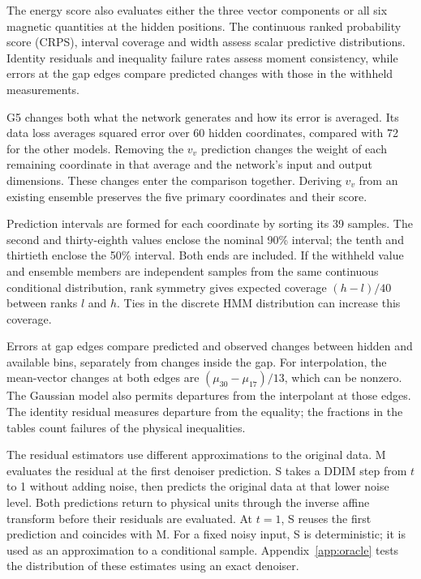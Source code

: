 \documentclass{article}
\begin{document}
The energy score also evaluates either the three vector components or all six magnetic quantities at the hidden positions. The continuous ranked probability score (CRPS), interval coverage and width assess scalar predictive distributions. Identity residuals and inequality failure rates assess moment consistency, while errors at the gap edges compare predicted changes with those in the withheld measurements.

G5 changes both what the network generates and how its error is averaged. Its data loss averages squared error over 60 hidden coordinates, compared with 72 for the other models. Removing the $v_v$ prediction changes the weight of each remaining coordinate in that average and the network's input and output dimensions. These changes enter the comparison together. Deriving $v_v$ from an existing ensemble preserves the five primary coordinates and their score.

Prediction intervals are formed for each coordinate by sorting its 39 samples. The second and thirty-eighth values enclose the nominal 90\% interval; the tenth and thirtieth enclose the 50\% interval. Both ends are included. If the withheld value and ensemble members are independent samples from the same continuous conditional distribution, rank symmetry gives expected coverage $(h-l)/40$ between ranks $l$ and $h$. Ties in the discrete HMM distribution can increase this coverage.

Errors at gap edges compare predicted and observed changes between hidden and available bins, separately from changes inside the gap. For interpolation, the mean-vector changes at both edges are $(\mu_{30}-\mu_{17})/13$, which can be nonzero. The Gaussian model also permits departures from the interpolant at those edges. The identity residual measures departure from the equality; the fractions in the tables count failures of the physical inequalities.

The residual estimators use different approximations to the original data. M evaluates the residual at the first denoiser prediction. S takes a DDIM step from $t$ to 1 without adding noise, then predicts the original data at that lower noise level. Both predictions return to physical units through the inverse affine transform before their residuals are evaluated. At $t=1$, S reuses the first prediction and coincides with M. For a fixed noisy input, S is deterministic; it is used as an approximation to a conditional sample. Appendix~\ref{app:oracle} tests the distribution of these estimates using an exact denoiser.
\end{document}
